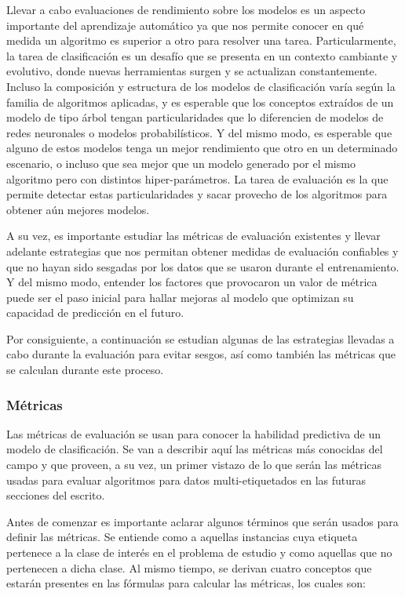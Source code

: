 Llevar a cabo evaluaciones de rendimiento sobre los modelos es un aspecto
importante del aprendizaje automático ya que nos permite conocer en qué medida
un algoritmo es superior a otro para resolver una tarea. Particularmente, la
tarea de clasificación es un desafío que se presenta en un contexto cambiante y
evolutivo, donde nuevas herramientas surgen y se actualizan constantemente.
Incluso la composición y estructura de los modelos de clasificación varía según
la familia de algoritmos aplicadas, y es esperable que los conceptos extraídos
de un modelo de tipo árbol tengan particularidades que lo diferencien de modelos
de redes neuronales o modelos probabilísticos. Y del mismo modo, es esperable
que alguno de estos modelos tenga un mejor rendimiento que otro en un
determinado escenario, o incluso que sea mejor que un modelo generado por el
mismo algoritmo pero con distintos hiper-parámetros. La tarea de evaluación es
la que permite detectar estas particularidades y sacar provecho de los
algoritmos para obtener aún mejores modelos.

A su vez, es importante estudiar las métricas de evaluación existentes y llevar
adelante estrategias que nos permitan obtener medidas de evaluación confiables y
que no hayan sido sesgadas por los datos que se usaron durante el entrenamiento.
Y del mismo modo, entender los factores que provocaron un valor de métrica puede
ser el paso inicial para hallar mejoras al modelo que optimizan su capacidad de
predicción en el futuro.

Por consiguiente, a continuación se estudian algunas de las estrategias llevadas
a cabo durante la evaluación para evitar sesgos, así como también las métricas
que se calculan durante este proceso.

\subsubsection{Métricas}
\label{evaluacion_metricas}

Las métricas de evaluación se usan para conocer la habilidad predictiva de un
modelo de clasificación. Se van a describir aquí las métricas más conocidas del
campo y que proveen, a su vez, un primer vistazo de lo que serán las métricas
usadas para evaluar algoritmos para datos multi-etiquetados en las futuras
secciones del escrito.

Antes de comenzar es importante aclarar algunos términos que serán usados para
definir las métricas. Se entiende como  a aquellas
instancias cuya etiqueta pertenece a la clase de interés en el problema de
estudio y  como aquellas que no pertenecen a dicha
clase. Al mismo tiempo, se derivan cuatro conceptos que estarán presentes en las
fórmulas para calcular las métricas, los cuales son:

